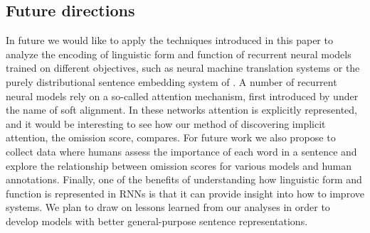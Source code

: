 \subsection{Future directions}

In future we would like to apply the techniques introduced in this paper 
to analyze the encoding of linguistic form and function of 
recurrent neural models trained on different objectives, 
such as neural machine translation systems
\cite{sutskever2014sequence} or the purely distributional
sentence embedding system of . A number of
recurrent neural models rely on a so-called attention mechanism, first
introduced by  under the name of soft
alignment. In these networks attention is explicitly represented, and it
would be interesting to see how our method of discovering implicit
attention, the omission score, compares. For future work we also propose to
collect data where humans assess the importance of each word in a sentence
and explore the relationship between omission scores for various models
and human annotations.\label{edit:humanjudgement} Finally, one of the benefits
of understanding how linguistic form and function is represented in RNNs is that
it can provide insight into how to improve systems. We plan to draw on
lessons learned from our analyses in order to develop models with better 
general-purpose sentence representations.
